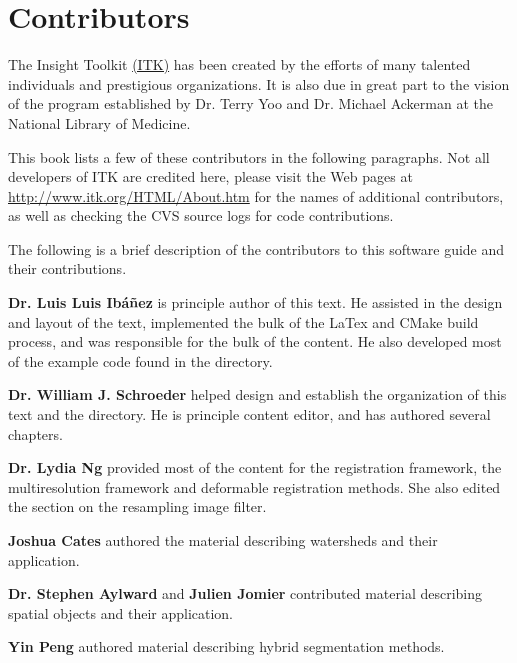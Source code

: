 \chapter*{Contributors}
\noindent

The Insight Toolkit \href{http://www.itk.org}{(ITK)} has been created by the
efforts of many talented individuals and prestigious organizations. It is also
due in great part to the vision of the program established by Dr. Terry Yoo
and Dr. Michael Ackerman at the National Library of Medicine.

This book lists a few of these contributors in the following paragraphs. Not
all developers of ITK are credited here, please visit the Web pages at
\href{http://www.itk.org/HTML/About.htm}{http://www.itk.org/HTML/About.htm} 
for the names of additional contributors, as well as checking the CVS source
logs for code contributions.

The following is a brief description of the contributors to this software
guide and their contributions.

{\bf Dr. Luis Luis Ib\'{a}\~{n}ez} is principle author of this text.
He assisted in the design and layout of the text, implemented the bulk of
the LaTex and CMake build process, and was responsible for the bulk of 
the content. He also developed most of the example code found in the
 directory.

{\bf Dr. William J. Schroeder} helped design and establish the organization 
of this text and the  directory. He is principle 
content editor, and has authored several chapters.

{\bf Dr. Lydia Ng} provided most of the content for the registration framework,
  the multiresolution framework and deformable registration methods. She also
  edited the section on the resampling image filter.

{\bf Joshua Cates} authored the material describing watersheds and their
application.

{\bf Dr. Stephen Aylward} and {\bf Julien Jomier} contributed material 
describing spatial objects and their application.

{\bf Yin Peng} authored material describing hybrid segmentation methods. 

